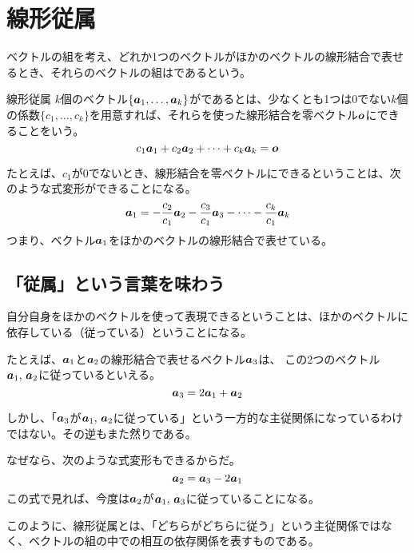 \documentclass[../../../topic_linear-algebra]{subfiles}
\begin{document}
\sectionline
\section{線形従属}

ベクトルの組を考え、どれか1つのベクトルがほかのベクトルの線形結合で表せるとき、それらのベクトルの組はであるという。

\begin{definition*}{線形従属}
  $k$個のベクトル$\{ \vb*{a}_1, \ldots, \vb*{a}_k \}$がであるとは、少なくとも1つは$0$でない$k$個の係数$\{c_1, \ldots, c_k\}$を用意すれば、それらを使った線形結合を零ベクトル$\vb*{o}$にできることをいう。
  \begin{equation*}
    c_1 \vb*{a}_1 + c_2 \vb*{a}_2 + \cdots + c_k\vb*{a}_{k} = \vb*{o}
  \end{equation*}
\end{definition*}

たとえば、$c_1$が$0$でないとき、線形結合を零ベクトルにできるということは、次のような式変形ができることになる。
\begin{equation*}
  \vb*{a}_1 = -\frac{c_2}{c_1} \vb*{a}_2 - \frac{c_3}{c_1} \vb*{a}_3 - \cdots - \frac{c_k}{c_1} \vb*{a}_{k}
\end{equation*}
つまり、ベクトル$\vb*{a}_1$をほかのベクトルの線形結合で表せている。

\subsection{「従属」という言葉を味わう}

自分自身をほかのベクトルを使って表現できるということは、ほかのベクトルに依存している（従っている）ということになる。

\br

たとえば、$\vb*{a}_1$と$\vb*{a}_2$の線形結合で表せるベクトル$\vb*{a}_3$は、 この2つのベクトル$\vb*{a}_1 ,\, \vb*{a}_2$に従っているといえる。
\begin{equation*}
  \vb*{a}_3 = 2 \vb*{a}_1 + \vb*{a}_2
\end{equation*}

しかし、「$\vb*{a}_3$が$\vb*{a}_1 ,\, \vb*{a}_2$に従っている」という一方的な主従関係になっているわけではない。その逆もまた然りである。

なぜなら、次のような式変形もできるからだ。
\begin{equation*}
  \vb*{a}_2 = \vb*{a}_3 - 2 \vb*{a}_1
\end{equation*}
この式で見れば、今度は$\vb*{a}_2$が$\vb*{a}_1 ,\, \vb*{a}_3$に従っていることになる。

\br

このように、線形従属とは、「どちらがどちらに従う」という主従関係ではなく、ベクトルの組の中での相互の依存関係を表すものである。
\end{document}
